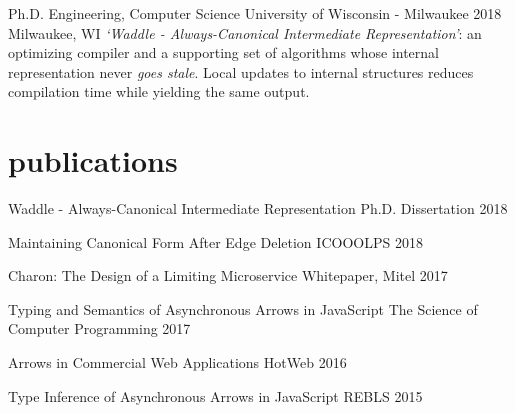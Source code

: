 \documentclass[]{clean-resume}
\begin{document}
\detailentry
  {Ph.D. Engineering, Computer Science}
  {University of Wisconsin - Milwaukee}
  {2018}
  {Milwaukee, WI}
  {
    \emph{`Waddle - Always-Canonical Intermediate Representation'}: an optimizing compiler and a supporting set of algorithms whose internal representation never \emph{goes stale}. Local updates to internal structures reduces compilation time while yielding the same output.
  }

\section{publications}


\lineentry
  {Waddle - Always-Canonical Intermediate Representation}
  {Ph.D. Dissertation}
  {2018}

\lineentry
  {Maintaining Canonical Form After Edge Deletion}
  {ICOOOLPS}
  {2018}

\lineentry
  {Charon: The Design of a Limiting Microservice}
  {Whitepaper, Mitel}
  {2017}

\lineentry
  {Typing and Semantics of Asynchronous Arrows in JavaScript}
  {The Science of Computer Programming}
  {2017}

\lineentry
  {Arrows in Commercial Web Applications}
  {HotWeb}
  {2016}

\lineentry
  {Type Inference of Asynchronous Arrows in JavaScript}
  {REBLS}
  {2015}
\end{document}
